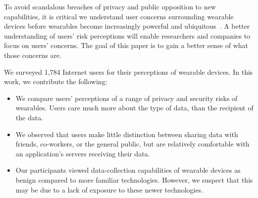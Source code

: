 To avoid scandalous breaches of privacy and public opposition to new capabilities, it is critical we understand user concerns surrounding wearable devices before wearables become increasingly powerful and ubiquitous~\cite{Implants}. A better understanding of users' risk perceptions will enable researchers and companies to focus on users' concerns. The goal of this paper is to gain a better sense of what those concerns are. 

We surveyed 1,784 Internet users for their perceptions of wearable devices. In this work, we contribute the following: \\[-0.8cm]

\begin{itemize} \itemsep1pt \parskip0pt 
\item We compare users' perceptions of a range of privacy and security risks of wearables. Users care much more about the type of data, than the recipient of the data.
\item We observed that users make little distinction between sharing data with friends, co-workers, or the general public, but are relatively comfortable with an application's servers receiving their data.
\item Our participants viewed data-collection capabilities of wearable devices as benign compared to more familiar technologies. However, we suspect that this may be due to a lack of exposure to these newer technologies.
\end{itemize}